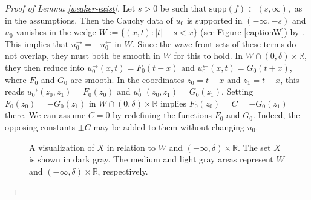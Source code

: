 \documentclass[10pt,a4paper]{article}
\theoremstyle{plain}
\theoremstyle{definition}
\theoremstyle{remark}
\numberwithin{equation}{section}
\newcommand{\R}{\mathbb{R}}
\begin{document}
\begin{proof}[Proof of Lemma \ref{weaker-exist}]
Let $s>0 $ be such that 
$
\text{supp} (f) \subset (s ,\infty),
$ 
as in the assumptions. 
Then the Cauchy data of $u_0$ is supported in $(-\infty ,-s)$ and 
$u_0$ vanishes in the wedge  $W:=  \{ (x,t) :   |t| - s < x  \}$ (see Figure \ref{captionW}) by   \cite[Th. 5.1.6]{duistermaat-FIOs}. 
This implies that 
 $u_0^\rightarrow = - u_0^\leftarrow $ in $W $. 
Since the wave front sets of these terms do not overlap, they must both be smooth in $W$ for this to hold. In $W \cap (0,\delta) \times \R$, 
they then reduce into $u_0^\rightarrow(x,t) =  F_0(t-x)$ and $u_0^\leftarrow(x,t) =  G_0(t+x)$, where $F_0$ and $G_0$ are smooth. 
In the coordinates $z_0 = t-x$ and $z_1 = t+x$, this reads $u_0^\rightarrow(z_0,z_1) =  F_0(z_0)$ and $u_0^\leftarrow(z_0,z_1) =  G_0(z_1)$.
Setting  $F_0(z_0)  = - G_0(z_1)$ in $W \cap (0,\delta) \times \R$ implies $F_0(z_0) = C = - G_0(z_1)$ there. 
We can assume $C=0$ by redefining the functions $F_0  $ and $G_0 $. Indeed, the opposing constants $\pm C$ may be added to them without changing $u_0$. 
\begin{figure}[ht]
\begin{center}
\caption{A visualization of $X$  in relation to $W$ and $(-\infty, \delta)\times \R$. 
The set $X$ is shown in dark gray.  The medium and light gray areas represent  $W$ and $(-\infty,\delta) \times \R$, respectively.  }\label{captionX}
\end{center}
\end{figure}

\end{proof}
\end{document}

